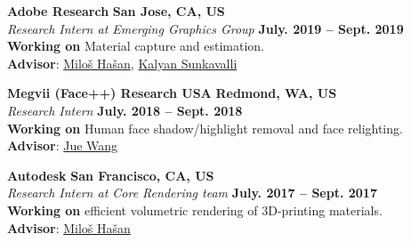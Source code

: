 \documentclass[margin,line]{resume}
\begin{document}
\begin{resume}
    \vspace{0.0mm}

	\textbf{Adobe Research} \hfill \textbf{San Jose, CA, US} \\
	\textsl{Research Intern at Emerging Graphics Group} \hfill \textbf{July. 2019 -- Sept. 2019}\\
	\textbf{Working on} Material capture and estimation.\\
	\textbf{Advisor}: \href{http://miloshasan.net/}{Milo\v{s} Ha\v{s}an}, \href{https://research.adobe.com/person/kalyan-sunkavalli/}{Kalyan Sunkavalli}       

    \vspace{0.0mm}

	\textbf{Megvii (Face++) Research USA} \hfill \textbf{Redmond, WA, US} \\
	\textsl{Research Intern} \hfill \textbf{July. 2018 -- Sept. 2018}\\
	\textbf{Working on} Human face shadow/highlight removal and face relighting.\\
	\textbf{Advisor}: \href{https://www.juew.org/}{Jue Wang}        

    \vspace{0.0mm}

    \textbf{Autodesk} \hfill \textbf{San Francisco, CA, US} \\
    \textsl{Research Intern at Core Rendering team} \hfill \textbf{July. 2017 -- Sept. 2017}\\
    \textbf{Working on} efficient volumetric rendering of 3D-printing materials.\\
    \textbf{Advisor}: \href{http://miloshasan.net/}{Milo\v{s} Ha\v{s}an}       
    
    \vspace{0.0mm}
    

\end{resume}
\end{document}
